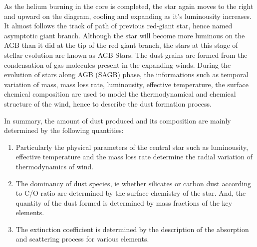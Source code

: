 \documentclass[12pt,a4paper]{report}
\begin{document}
As the helium burning in the core is completed, the star again moves to the right and upward on the diagram, cooling and expanding as it's luminousity increases. It almost follows the track of path of previous red-giant star, hence named asymptotic giant branch. Although the star will become more luminous  on the AGB than it did at the tip of the red giant branch, the stars at this stage of stellar evolution are known as AGB Stars\cite{D. Gobrecht}.
\clearpage
The dust grains are formed from the condensation of gas molecules present in the expanding winds. During the evolution of stars along AGB (SAGB) phase, the informations such as temporal variation of mass, mass loss rate, luminousity, effective temperature, the surface chemical composition are used to model the thermodynamical and chemical structure of the wind, hence to describe the dust formation process.

In summary, the amount of dust produced and its composition are mainly determined by the following quantities:
\begin{enumerate}
	\item Particularly the physical parameters of the central star such as luminousity, effective temperature and the mass loss rate determine the radial variation of thermodynamics of wind.
	
	\item The dominancy of dust species, ie whether silicates or carbon dust according to C/O ratio are determined by the surface chemistry of the star. And, the quantity of the dust formed is determined by mass fractions of the key elements.
	
	\item The extinction coefficient is determined by the description of the absorption and scattering process for various elements.
	
\end{enumerate}	
\end{document}

